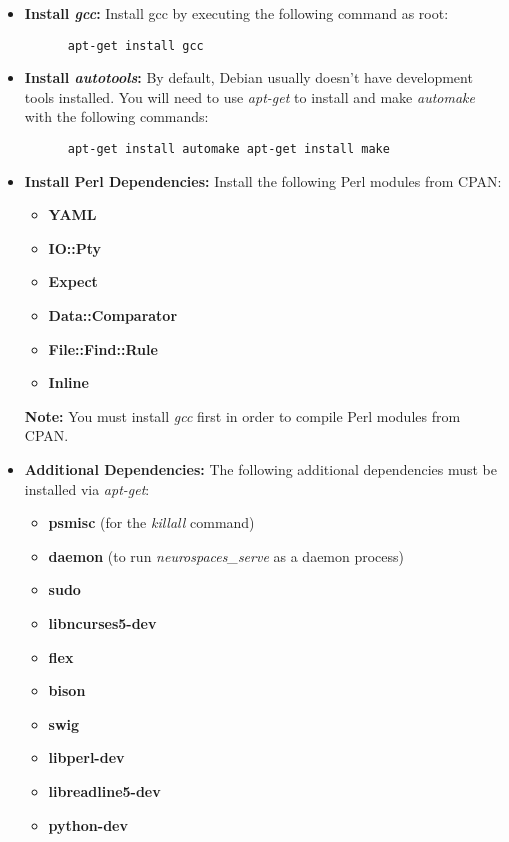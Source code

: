 \documentclass[12pt]{article}
\begin{document}
\begin{itemize}
   \item[]{\bf Install {\it gcc}:} Install gcc by executing the following command as root:
   \begin{verbatim}
      apt-get install gcc
   \end{verbatim}
   
   \item[]{\bf Install {\it autotools}:} By default, Debian usually doesn't have development tools installed. You will need to use {\it apt-get} to install and make {\it automake} with the following commands:
   \begin{verbatim}
      apt-get install automake apt-get install make
   \end{verbatim}
   
   \item[]{\bf Install Perl Dependencies:} Install the following Perl modules from CPAN:
     \begin{itemize}
        \item[]{\bf YAML}
        \item[]{\bf IO::Pty}
        \item[]{\bf Expect}
        \item[]{\bf Data::Comparator}
        \item[]{\bf File::Find::Rule}
        \item[]{\bf Inline}
     \end{itemize}
     {\bf Note:} You must install {\it gcc} first in order to compile Perl modules from CPAN.     

   \item[]{\bf Additional Dependencies:} The following additional dependencies must be installed via {\it apt-get}:
     \begin{itemize}
        \item[]{\bf psmisc} (for the {\it killall} command)
        \item[]{\bf daemon} (to run {\it neurospaces\_serve} as a daemon process)
        \item[]{\bf sudo}
        \item[]{\bf libncurses5-dev}
        \item[]{\bf flex}
        \item[]{\bf bison}
        \item[]{\bf swig}
        \item[]{\bf libperl-dev}
        \item[]{\bf libreadline5-dev}
        \item[]{\bf python-dev}
     \end{itemize}
\end{itemize}
\end{document}
